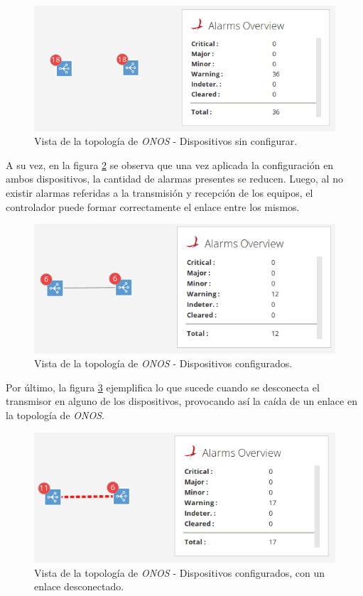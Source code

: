   \begin{figure}[H]
	\centering
	\includegraphics[scale=0.5]{Figures/test5_1.png}
	\caption{Vista de la topología de \textit{ONOS} - Dispositivos sin configurar.}
	\label{fig:test5_1}
  \end{figure}

  A su vez, en la figura \ref{fig:test5_2} se observa que una vez aplicada la configuración en ambos dispositivos, la cantidad de alarmas presentes se reducen. Luego, al no existir alarmas referidas a la transmisión y recepción de los equipos, el controlador puede formar correctamente el enlace entre los mismos. 

  \begin{figure}[H]
	\centering
	\includegraphics[scale=0.5]{Figures/test5_2.png}
	\caption{Vista de la topología de \textit{ONOS} - Dispositivos configurados.}
	\label{fig:test5_2}
  \end{figure}

  Por último, la figura \ref{fig:test5_3} ejemplifica lo que sucede cuando se desconecta el transmisor en alguno de los dispositivos, provocando así la caída de un enlace en la topología de \textit{ONOS}.

  \begin{figure}[H]
	\centering
	\includegraphics[scale=0.5]{Figures/test5_3.png}
	\caption{Vista de la topología de \textit{ONOS} - Dispositivos configurados, con un enlace desconectado.}
	\label{fig:test5_3}
  \end{figure}



